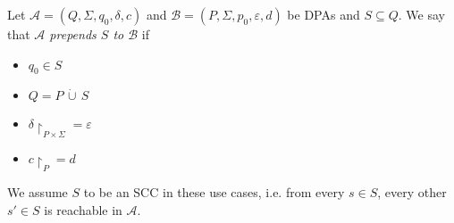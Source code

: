 \begin{defn}
	Let $\mathcal{A} = (Q, \Sigma, q_0, \delta, c)$ and $\mathcal{B} = (P, \Sigma, p_0, \varepsilon, d)$ be DPAs and $S \subseteq Q$. We say that \emph{$\mathcal{A}$ prepends $S$ to $\mathcal{B}$} if 
	\begin{itemize}
		\item $q_0 \in S$
		\item $Q = P \,\dot{\cup}\, S$
		\item $\delta\upharpoonright_{P \times \Sigma} = \varepsilon$
		\item $c\upharpoonright_P = d$
	\end{itemize}
	
	We assume $S$ to be an SCC in these use cases, i.e. from every $s \in S$, every other $s' \in S$ is reachable in $\mathcal{A}$.
\end{defn} 

